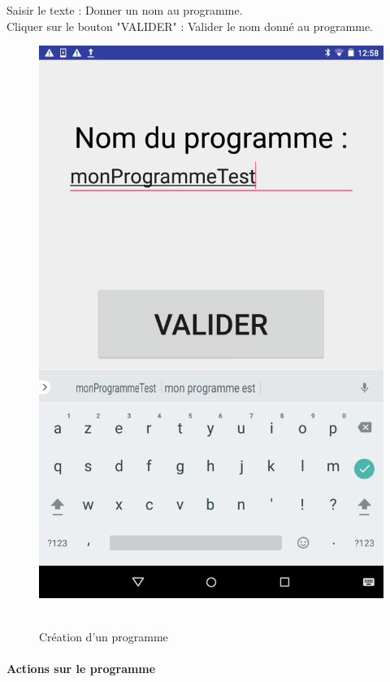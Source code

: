 \documentclass[12pt,francais]{report}
\begin{document}
Saisir le texte : Donner un nom au programme.\\
Cliquer sur le bouton "VALIDER" : Valider le nom donné au programme.

\begin{figure}[!h]
\centering
\includegraphics[scale=0.2]{./images/newProg.png}~\\[1.5cm]
\caption{Création d'un programme}
\end{figure}

\paragraph*{Actions sur le programme\\}
\medskip
\end{document}
